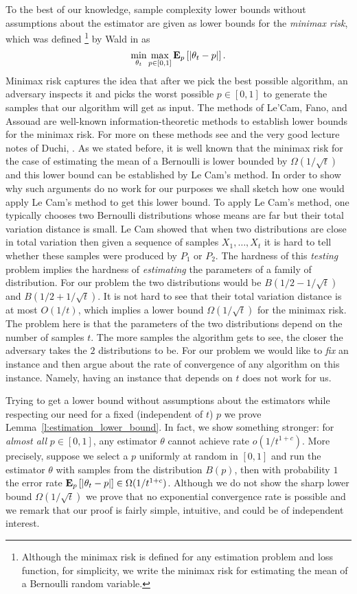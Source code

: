 To the best of our knowledge, sample complexity lower bounds without
assumptions about the estimator are given as lower bounds for the
\emph{minimax risk}, which was defined
\footnote{
  Although the minimax risk is defined for any estimation problem and loss
  function, for simplicity, we write the minimax risk for estimating the mean
  of a Bernoulli random variable.}
by Wald in \cite{Wal39} as
\[
  \min_{\theta_t} \max_{p\in[0,1]} \bm{\mathrm{E}}_{p} \left[ |\theta_t - p| \right].
\]
\noindent Minimax risk captures the idea that after we pick the best possible
algorithm, an adversary inspects it and picks the worst possible
$p \in[0,1]$ to generate the samples that our algorithm will get as input.
The methods of Le'Cam, Fano, and Assouad are well-known
information-theoretic methods to establish lower bounds for the minimax risk.
For more on these methods see \cite{Yu97,Tsy08} and the
very good lecture notes of Duchi, \cite{duchi_stats311}.
As we stated before, it is well known that the minimax risk for the
case of estimating the mean of a Bernoulli is lower bounded by
$\Omega(1/\sqrt{t})$ and this lower bound can be established
by Le Cam's method.
In order to show why such arguments do no work for our purposes
we shall sketch how one would apply Le Cam's method to get this lower bound.
To apply Le Cam's method, one typically chooses two Bernoulli distributions
whose means are far but their total variation distance is small.
Le Cam showed that when two distributions are close in total variation then
given a sequence of samples $X_1, \ldots, X_t$ it is hard to tell whether
these samples were produced by $P_1$ or $P_2$. The hardness of this \emph{testing}
problem implies the hardness of \emph{estimating} the parameters of
a family of distribution.
For our problem the two distributions would be $B(1/2 - 1/\sqrt{t})$
and $B(1/2 + 1/\sqrt{t})$. It is not hard to see that their total variation
distance is at most $O(1/t)$, which implies a lower bound
$\Omega(1/\sqrt{t})$ for the minimax risk. The problem here is that
the parameters of the two distributions depend on the number of
samples $t$. The more samples the algorithm gets to see, the closer
the adversary takes the $2$ distributions to be.
For our problem we would like to \emph{fix} an instance and then argue
about the rate of convergence of any algorithm on this instance.
Namely, having an instance that depends on $t$ does not work for us.

Trying to get a lower bound without assumptions about the estimators
while respecting our need for a fixed (independent of $t$) $p$ we prove
Lemma~\ref{l:estimation_lower_bound}.
In fact, we show something stronger:
for \emph{almost all} $p \in [0,1]$, any estimator $\theta$ cannot
achieve rate $o(1/t^{1+c})$.
More precisely,  suppose we select a $p$ uniformly at
random in $[0,1]$ and run the estimator $\theta$ with samples from the
distribution $B(p)$, then with probability $1$ the error rate $\bm{\mathrm{E}}_{p} \left[ |\theta_t  - p | \right] \in
\Omega(1/t^{1+c})$. Although we do not show the sharp lower bound
$\Omega(1/\sqrt{t})$ we prove that no exponential convergence rate
is possible and we remark that our proof is fairly simple, intuitive,
and could be of independent interest.
%

